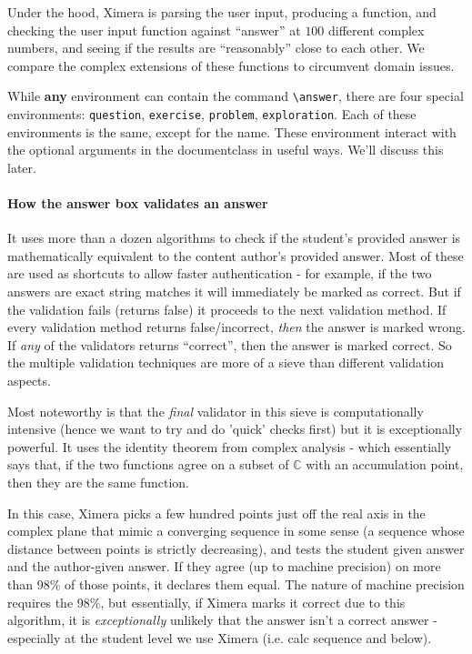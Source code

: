 \documentclass{ximera}
\begin{document}
\begin{remark}
  Under the hood, Ximera is parsing the user input, producing a
  function, and checking the user input function against ``answer'' at
  $100$ different complex numbers, and seeing if the results are
  ``reasonably'' close to each other.  We compare the complex extensions
  of these functions to circumvent domain issues.
\end{remark}

While \textbf{any} environment can contain the command \verb|\answer|,
there are four special environments: \verb|question|, \verb|exercise|,
\verb|problem|, \verb|exploration|. Each of these environments is the
same, except for the name. These environment interact with the
optional arguments in the documentclass in useful ways. We'll discuss
this later.

\paragraph{How the answer box validates an answer}

It uses more than a dozen algorithms to check if the student's provided answer
is mathematically equivalent to the content author's provided answer. Most of
these are used as shortcuts to allow faster authentication - for example, if
the two answers are exact string matches it will immediately be marked as
correct. But if the validation fails (returns false) it proceeds to the next
validation method. If every validation method returns false/incorrect,
\textit{then} the answer is marked wrong. If \textit{any} of the validators
returns ``correct'', then the answer is marked correct. So the multiple
validation techniques are more of a sieve than different validation aspects.

Most noteworthy is that the \textit{final} validator in this sieve is
computationally intensive (hence we want to try and do 'quick' checks first)
but it is exceptionally powerful. It uses the identity theorem from complex
analysis - which essentially says that, if the two functions agree on a subset
of $\mathbb{C}$ with an accumulation point, then they are the same function.

In this case, Ximera picks a few hundred points just off the real axis in the
complex plane that mimic a converging sequence in some sense (a sequence whose
distance between points is strictly decreasing), and tests the student given
answer and the author-given answer. If they agree (up to machine precision) on
more than 98\% of those points, it declares them equal. The nature of machine
precision requires the 98\%, but essentially, if Ximera marks it correct due to
this algorithm, it is \textit{exceptionally} unlikely that the answer isn't a
correct answer - especially at the student level we use Ximera (i.e. calc
sequence and below).
\end{document}
